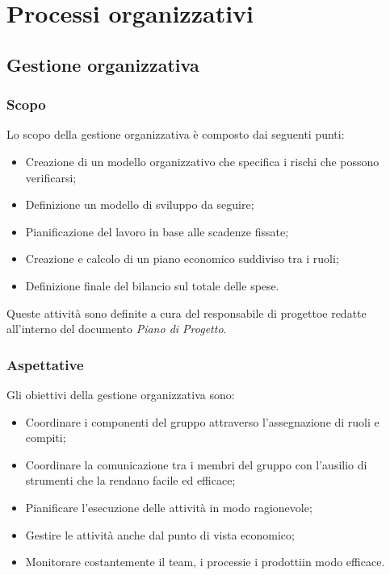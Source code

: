 %
\section{Processi organizzativi}
	\subsection{Gestione organizzativa}
		\subsubsection{Scopo}
			Lo scopo della gestione organizzativa è composto dai seguenti punti:
			\begin{itemize}
				\item Creazione di un modello organizzativo che specifica i rischi che possono verificarsi;
				\item Definizione un modello di sviluppo da seguire;
				\item Pianificazione del lavoro in base alle scadenze fissate;
				\item Creazione e calcolo di un piano economico suddiviso tra i ruoli;
				\item Definizione finale del bilancio sul totale delle spese.
			\end{itemize}
			Queste attività sono definite a cura del responsabile di progetto\glosp e redatte all'interno del documento \textit{Piano di Progetto}.
		\subsubsection{Aspettative}
			Gli obiettivi della gestione organizzativa sono:
			\begin{itemize}
				\item Coordinare i componenti del gruppo attraverso l'assegnazione di ruoli e compiti;
				\item Coordinare la comunicazione tra i membri del gruppo con l'ausilio di strumenti che la rendano facile ed efficace;
				\item Pianificare l'esecuzione delle attività in modo ragionevole;
				\item Gestire le attività anche dal punto di vista economico;
				\item Monitorare costantemente il team, i processi\glosp e i prodotti\glosp in modo efficace.
			\end{itemize}

